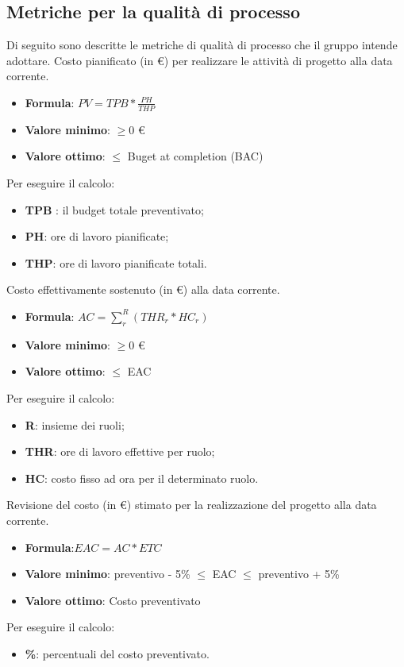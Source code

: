 \subsection{Metriche per la qualità di processo}
Di seguito sono descritte le metriche di qualità di processo che il gruppo intende adottare.
Costo pianificato (in \euro) per realizzare le attività di progetto alla data corrente.
\begin{itemize}
    \item \textbf{Formula}: $PV = TPB * \frac{PH}{THP}$
    \item \textbf{Valore minimo}: $\geq0$ \euro
    \item \textbf{Valore ottimo}: $\leq$ Buget at completion (BAC)
\end{itemize}  
Per eseguire il calcolo:
\begin{itemize}
    \item \textbf{TPB} : il budget totale preventivato;
    \item \textbf{PH}: ore di lavoro pianificate;
    \item \textbf{THP}: ore di lavoro pianificate totali.
\end{itemize}

Costo effettivamente sostenuto (in €) alla data corrente. 
\begin{itemize}
    \item \textbf{Formula}: $AC = \sum_{r}^{R}(THR_r*HC_r)$
    \item \textbf{Valore minimo}: $\geq0$ \euro
    \item \textbf{Valore ottimo}: $\leq$ EAC
\end{itemize}  
Per eseguire il calcolo:
\begin{itemize}
    \item \textbf{R}: insieme dei ruoli;
    \item \textbf{THR}: ore di lavoro effettive per ruolo;
    \item \textbf{HC}: costo fisso ad ora per il determinato ruolo.
\end{itemize}

Revisione del costo (in \euro) stimato per la realizzazione del progetto alla data corrente. 
\begin{itemize}
    \item \textbf{Formula}:$EAC = AC*ETC$
    \item \textbf{Valore minimo}: preventivo - 5\% $\leq$ EAC $\leq$  preventivo + 5\%
    \item \textbf{Valore ottimo}: Costo preventivato
\end{itemize}  
Per eseguire il calcolo:
\begin{itemize}
    \item \textbf{\%}: percentuali del costo preventivato.
\end{itemize}

